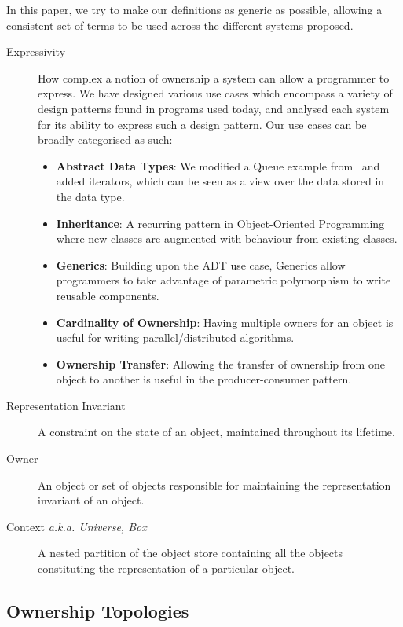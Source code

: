\documentclass{acm_proc_article-sp}
\begin{document}
In this paper, we try to make our definitions as generic as possible, allowing
a consistent set of terms to be used across the different systems proposed.

\begin{description}
	\item[Expressivity] How complex a notion of ownership a system can allow a
		programmer to express. We have designed various use cases which
		encompass a variety of design patterns found in programs used today, and
		analysed each system for its ability to express such a design pattern.
		Our use cases can be broadly categorised as such:

	\begin{itemize}
		\item \textbf{Abstract Data Types}: We modified a Queue example
			from~\cite{boyapati04safejava} and added iterators, which can be 
			seen as a view over the data stored in the data type.
		\item \textbf{Inheritance}: A recurring pattern in Object-Oriented
			Programming where new classes are augmented with behaviour from 
			existing classes.
		\item \textbf{Generics}: Building upon the ADT use case, Generics
			allow programmers to take advantage of parametric polymorphism to
			write reusable components.
		\item \textbf{Cardinality of Ownership}: Having multiple owners for an
			object is useful for writing parallel/distributed algorithms.
		\item \textbf{Ownership Transfer}: Allowing the transfer of ownership
			from one object to another is useful in the \linebreak 
			producer-consumer pattern.
	\end{itemize}

	\item[Representation Invariant] A constraint on the state of an object,
		maintained throughout its lifetime.
	\item[Owner] An object or set of objects responsible for maintaining the
		representation invariant of an object.
	\item[Context \emph{a.k.a. Universe, Box}] A nested partition of the object
		store containing all the objects constituting the representation of
		a particular object.
\end{description}

\subsection{Ownership Topologies}
\label{subsec:topologies}
\end{document}
